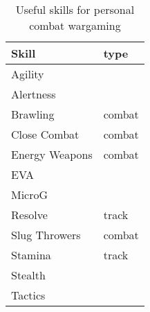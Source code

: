 \begin{wraptable}[14]{r}[\sidebarwidth]{5cm}
\centering
\begin{tabular}{ll}\toprule
Skill & type \\
\midrule
Agility		\\
Alertness	\\
Brawling	& combat \\
Close Combat	& combat \\
Energy Weapons	& combat \\
EVA		\\
MicroG		\\
Resolve		& track \\
Slug Throwers	& combat \\
Stamina		& track \\
Stealth		\\
Tactics		\\
\bottomrule
\end{tabular}
\caption{Useful skills for personal combat wargaming}
\label{tab:personal-wargaming-skills}
\end{wraptable}
